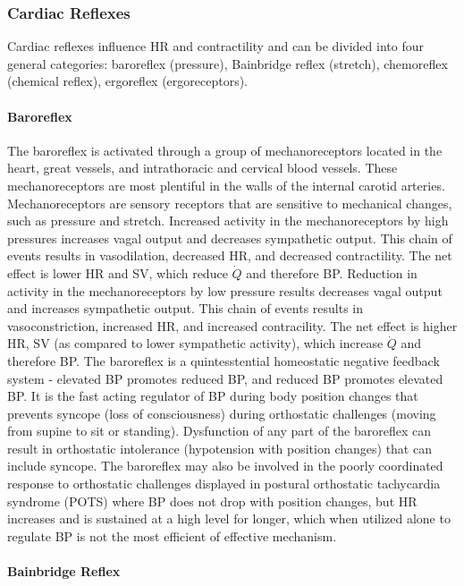 \subsubsection{Cardiac Reflexes}
Cardiac reflexes influence HR and contractility and can be divided into four general categories: baroreflex (pressure), Bainbridge reflex (stretch), chemoreflex (chemical reflex), ergoreflex (ergoreceptors). 

\paragraph{Baroreflex}

The baroreflex is activated through a group of mechanoreceptors located in the heart, great vessels, and intrathoracic and cervical blood vessels. These mechanoreceptors are most plentiful in the walls of the internal carotid arteries. Mechanoreceptors are sensory receptors that are sensitive to mechanical changes, such as pressure and stretch. Increased activity in the mechanoreceptors by high pressures increases vagal output and decreases sympathetic output. This chain of events results in vasodilation, decreased HR, and decreased contractility. The net effect is lower HR and SV, which reduce $\dot{Q}$ and therefore BP. Reduction in activity in the mechanoreceptors by low pressure results decreases vagal output and increases sympathetic output. This chain of events results in vasoconstriction, increased HR, and increased contracility. The net effect is higher HR,  SV (as compared to lower sympathetic activity), which increase $\dot{Q}$ and therefore BP. The baroreflex is a quintesstential homeostatic negative feedback system - elevated BP promotes reduced BP, and reduced BP promotes elevated BP. It is the fast acting regulator of BP during body position changes that prevents syncope (loss of consciousness) during orthostatic challenges  (moving from supine to sit or standing).
Dysfunction of any part of the baroreflex can result in orthostatic intolerance (hypotension with position changes) that can include syncope. The baroreflex may also be involved in the poorly coordinated response to orthostatic challenges displayed in postural orthostatic tachycardia syndrome (POTS) where BP does not drop with position changes, but HR increases and is sustained at a high level for longer, which when utilized alone to regulate BP is not the most efficient of effective mechanism.  



\paragraph{Bainbridge Reflex}

